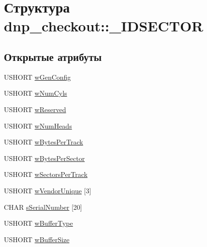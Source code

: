\hypertarget{structdnp__checkout_1_1___i_d_s_e_c_t_o_r}{\section{Структура dnp\-\_\-checkout\-:\-:\-\_\-\-I\-D\-S\-E\-C\-T\-O\-R}
\label{structdnp__checkout_1_1___i_d_s_e_c_t_o_r}
}
\subsection*{Открытые атрибуты}
\begin{DoxyCompactItemize}
\item 
U\-S\-H\-O\-R\-T \hyperlink{structdnp__checkout_1_1___i_d_s_e_c_t_o_r_a5b2e7e0550acb8a5f1789f38be813b8e}{w\-Gen\-Config}
\item 
U\-S\-H\-O\-R\-T \hyperlink{structdnp__checkout_1_1___i_d_s_e_c_t_o_r_af997deb5495006bb3d45f86e5d315ee8}{w\-Num\-Cyls}
\item 
U\-S\-H\-O\-R\-T \hyperlink{structdnp__checkout_1_1___i_d_s_e_c_t_o_r_aad610ba0d11d7f159c2baa19cf3d4ee2}{w\-Reserved}
\item 
U\-S\-H\-O\-R\-T \hyperlink{structdnp__checkout_1_1___i_d_s_e_c_t_o_r_a5d8014d3e75713d9f3d11d93a5334cdc}{w\-Num\-Heads}
\item 
U\-S\-H\-O\-R\-T \hyperlink{structdnp__checkout_1_1___i_d_s_e_c_t_o_r_a2eea43f5a3648e5873940fa0c623af50}{w\-Bytes\-Per\-Track}
\item 
U\-S\-H\-O\-R\-T \hyperlink{structdnp__checkout_1_1___i_d_s_e_c_t_o_r_ad69920d172f58526dda2ed02a2b7d33e}{w\-Bytes\-Per\-Sector}
\item 
U\-S\-H\-O\-R\-T \hyperlink{structdnp__checkout_1_1___i_d_s_e_c_t_o_r_ac987056a21d435ae42e638f67f2f84ba}{w\-Sectors\-Per\-Track}
\item 
U\-S\-H\-O\-R\-T \hyperlink{structdnp__checkout_1_1___i_d_s_e_c_t_o_r_a8b3afb04cf2de431fbf5fe0ae2d992e0}{w\-Vendor\-Unique} \mbox{[}3\mbox{]}
\item 
C\-H\-A\-R \hyperlink{structdnp__checkout_1_1___i_d_s_e_c_t_o_r_a588ac894cadbe33be3d6fafe3eece2bb}{s\-Serial\-Number} \mbox{[}20\mbox{]}
\item 
U\-S\-H\-O\-R\-T \hyperlink{structdnp__checkout_1_1___i_d_s_e_c_t_o_r_ae5a2d3fdb4b858b34409017de2e3eb3b}{w\-Buffer\-Type}
\item 
U\-S\-H\-O\-R\-T \hyperlink{structdnp__checkout_1_1___i_d_s_e_c_t_o_r_a85d6028622dbd707d17e2b3ba3cb6c0b}{w\-Buffer\-Size}

\end{DoxyCompactItemize}
